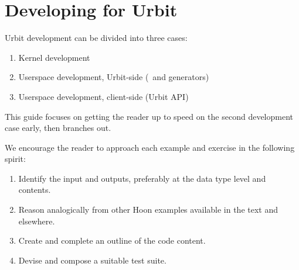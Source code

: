 \section{Developing for Urbit}

Urbit development can be divided into three cases:

\begin{enumerate}
	\item  Kernel development
	\item  Userspace development, Urbit-side (\gall~and generators)
	\item  Userspace development, client-side (Urbit API)
\end{enumerate}

This guide focuses on getting the reader up to speed on the second development case early, then branches out.

We encourage the reader to approach each example and exercise in the following spirit:

\begin{enumerate}
  \item  Identify the input and outputs, preferably at the data type level and contents.
	\item  Reason analogically from other Hoon examples available in the text and elsewhere.
	\item  Create and complete an outline of the code content.
	\item  Devise and compose a suitable test suite.
\end{enumerate}
